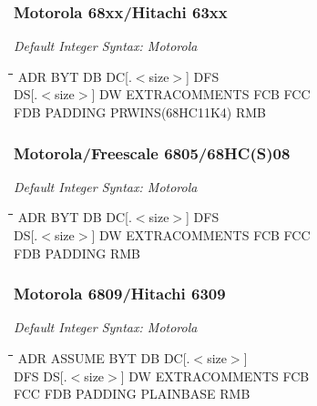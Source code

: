 \subsubsection{Motorola 68xx/Hitachi 63xx}

{\em Default Integer Syntax: Motorola}

{\tt\begin{tabbing}
\hspace{3cm}\=\hspace{3cm}\=\hspace{3cm}\=\hspace{3cm}\=\kill
ADR        \> BYT         \> DB          \> DC[.$<$size$>$] \> DFS \\
DS[.$<$size$>$] \> DW     \> EXTRACOMMENTS \> FCB         \> FCC \\
 FDB       \> PADDING     \> PRWINS(68HC11K4) \> RMB \\
\end{tabbing}}

\subsubsection{Motorola/Freescale 6805/68HC(S)08}

{\em Default Integer Syntax: Motorola}

{\tt\begin{tabbing}
\hspace{3cm}\=\hspace{3cm}\=\hspace{3cm}\=\hspace{3cm}\=\kill
ADR        \> BYT         \> DB          \> DC[.$<$size$>$] \> DFS \\
DS[.$<$size$>$] \> DW     \> EXTRACOMMENTS \> FCB           \> FCC \\
FDB        \> PADDING     \> RMB \\
\end{tabbing}}

\subsubsection{Motorola 6809/Hitachi 6309}

{\em Default Integer Syntax: Motorola}

{\tt\begin{tabbing}
\hspace{3cm}\=\hspace{3cm}\=\hspace{3cm}\=\hspace{3cm}\=\kill
ADR        \> ASSUME      \> BYT         \> DB          \> DC[.$<$size$>$] \\
DFS        \> DS[.$<$size$>$] \> DW      \> EXTRACOMMENTS \> FCB \\
FCC        \> FDB         \> PADDING     \> PLAINBASE   \> RMB \\
\end{tabbing}}

